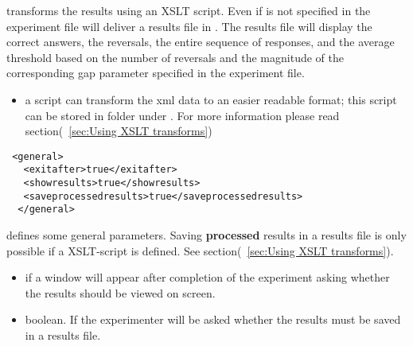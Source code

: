  transforms the results using an XSLT script.
Even if  is not specified in the experiment file
\apex will deliver a results file in . The results file
will display the correct answers, the reversals, the entire
sequence of responses, and the average threshold based on the
number of reversals and the magnitude of the corresponding gap
parameter specified in the experiment file.

\begin{itemize}
\item {} a script can transform the xml data to
an easier readable format; this script can be stored in folder
 under \apex. For more information please read
section(~\ref{sec:Using XSLT transforms})
\end{itemize}



\begin{lstlisting}
 <general>
   <exitafter>true</exitafter>
   <showresults>true</showresults>
   <saveprocessedresults>true</saveprocessedresults>
  </general>
\end{lstlisting}


 defines some general parameters. Saving
\textbf{processed} results in a results file is only possible if a
XSLT-script is defined. See section(~\ref{sec:Using XSLT
transforms}).

\begin{itemize}
\item {} if  a window will appear
after completion of the experiment asking whether the results
should be viewed on screen.

\item {} boolean. If  the
experimenter will be asked whether the results must be saved in a
results file.
\end{itemize}
